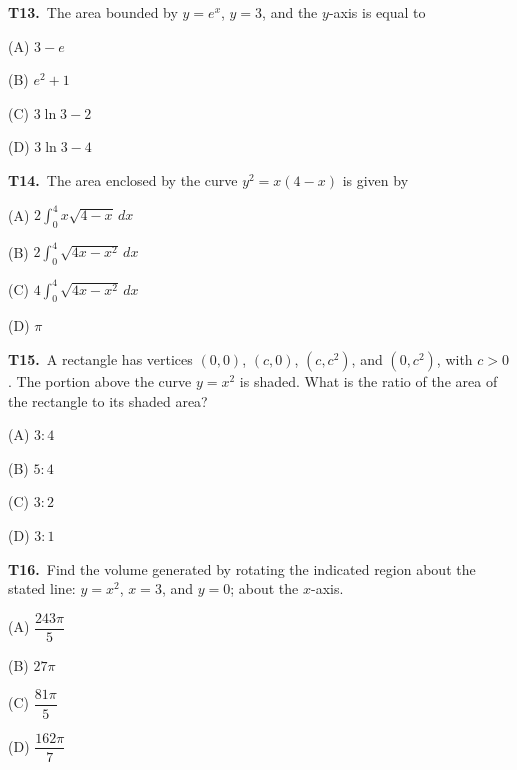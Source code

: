 \documentclass[11pt]{article}
\begin{document}
\bigskip\noindent\textbf{T13.}\ The area bounded by $y=e^x$, $y=3$, and the $y$-axis is equal to
\begin{list}{}{\setlength{\leftmargin}{3em}\setlength{\labelwidth}{2.5em}\setlength{\itemsep}{0pt}\setlength{\topsep}{2pt}}
\item[(A)] $3-e$
\item[(B)] $e^2+1$
\item[(C)] $3\ln 3-2$
\item[(D)] $3\ln 3-4$
\end{list}

\bigskip\noindent\textbf{T14.}\ The area enclosed by the curve $y^2=x(4-x)$ is given by
\begin{list}{}{\setlength{\leftmargin}{3em}\setlength{\labelwidth}{2.5em}\setlength{\itemsep}{0pt}\setlength{\topsep}{2pt}}
\item[(A)] $\displaystyle 2\int_0^4 x\sqrt{4-x}\,dx$
\item[(B)] $\displaystyle 2\int_0^4 \sqrt{4x-x^2}\,dx$
\item[(C)] $\displaystyle 4\int_0^4 \sqrt{4x-x^2}\,dx$
\item[(D)] $\pi$
\end{list}

\bigskip\noindent\textbf{T15.}\ A rectangle has vertices $(0,0)$, $(c,0)$, $(c,c^2)$, and $(0,c^2)$, with $c>0$. The portion above the curve $y=x^2$ is shaded. What is the ratio of the area of the rectangle to its shaded area?
\begin{list}{}{\setlength{\leftmargin}{3em}\setlength{\labelwidth}{2.5em}\setlength{\itemsep}{0pt}\setlength{\topsep}{2pt}}
\item[(A)] $3:4$
\item[(B)] $5:4$
\item[(C)] $3:2$
\item[(D)] $3:1$
\end{list}

\bigskip\noindent\textbf{T16.}\ Find the volume generated by rotating the indicated region about the stated line: $y=x^2$, $x=3$, and $y=0$; about the $x$-axis.
\begin{list}{}{\setlength{\leftmargin}{3em}\setlength{\labelwidth}{2.5em}\setlength{\itemsep}{0pt}\setlength{\topsep}{2pt}}
\item[(A)] $\dfrac{243\pi}{5}$
\item[(B)] $27\pi$
\item[(C)] $\dfrac{81\pi}{5}$
\item[(D)] $\dfrac{162\pi}{7}$
\end{list}
\end{document}
